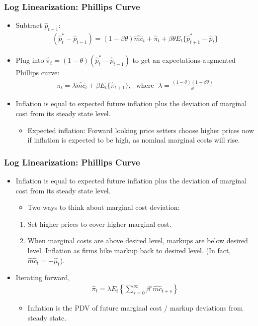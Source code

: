 \documentclass[english,xcolor=svgnames]{beamer}
\begin{document}
\begin{frame}
\frametitle{Log Linearization: Phillips Curve
}
\begin{itemize}
	\item Subtract $\hat{p}_{t-1}$:
	\begin{align*}
		(\hat{p}_t^*-\hat{p}_{t-1})=(1-\beta\theta)\hat{mc}_{t}+\hat{\pi}_t+\beta\theta E_t\{\hat{p}_{t+1}^*-\hat{p}_{t}\}
	\end{align*}
	\item Plug into $\hat{\pi}_t=(1-\theta)(\hat{p}_t^*-\hat{p}_{t-1})$ to get an expectations-augmented Phillips curve:
	\begin{align*}
		\hat{\pi}_t=\lambda\hat{mc}_{t}+\beta E_t\{\hat{\pi}_{t+1}\},\;\text{ where }\;\lambda=\frac{(1-\theta)(1-\beta\theta)}{\theta}
	\end{align*}
	\item Inflation is equal to expected future inflation plus the deviation of marginal cost from its steady state level.
	\begin{itemize}
		\item Expected inflation: Forward looking price setters choose higher prices now if inflation is expected to be high, as nominal marginal costs will rise.
	\end{itemize}
\end{itemize}
\end{frame}


\begin{frame}
\frametitle{Log Linearization: Phillips Curve
}
\begin{itemize}
	\item Inflation is equal to expected future inflation plus the deviation of marginal cost from its steady state level.
	\begin{itemize}
		\item Two ways to think about marginal cost deviation:
	\end{itemize}
	\begin{enumerate}[1.]
		\item Set higher prices to cover higher marginal cost.
		\item When marginal costs are above desired level, markups are
below desired level. Inflation as firms hike markup back to desired level. (In fact, $\hat{mc}_t = -\hat{\mu}_t$).
	\end{enumerate}
	\item Iterating forward,
	\begin{align*}
		\hat{\pi}_t=\lambda E_t\left\{\sum_{s=0}^{\infty}\beta^s\hat{mc}_{t+s}\right\}
	\end{align*}
	\begin{itemize}
		\item Inflation is the PDV of future marginal cost / markup deviations from steady state.
	\end{itemize}
\end{itemize}
\end{frame}
\end{document}
